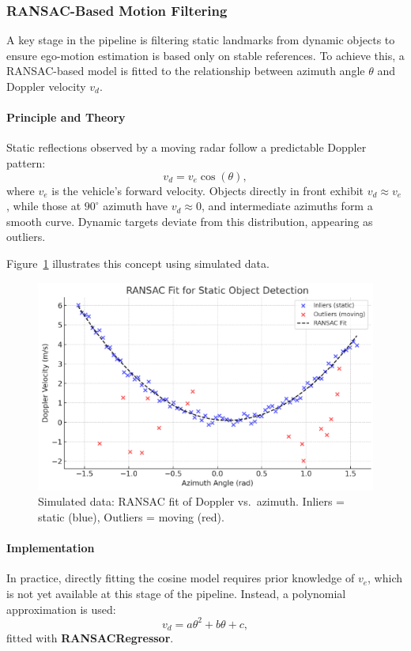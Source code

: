 \subsubsection{RANSAC-Based Motion Filtering}
A key stage in the pipeline is filtering static landmarks from dynamic objects to ensure ego-motion estimation is based only on stable references.  
To achieve this, a RANSAC-based model is fitted to the relationship between azimuth angle $\theta$ and Doppler velocity $v_d$.

\paragraph{Principle and Theory}
Static reflections observed by a moving radar follow a predictable Doppler pattern:
\[
v_d = v_e \cos(\theta),
\]
where $v_e$ is the vehicle’s forward velocity.  
Objects directly in front exhibit $v_d \approx v_e$, while those at $90^\circ$ azimuth have $v_d \approx 0$, and intermediate azimuths form a smooth curve.  
Dynamic targets deviate from this distribution, appearing as outliers.  

Figure~\ref{fig:ransac_simulated_static_dynamic} illustrates this concept using simulated data.

\begin{figure}[!htbp]
    \centering
    \includegraphics[width=0.9\linewidth]{images/RANSAC.png}
    \caption{Simulated data: RANSAC fit of Doppler vs.\ azimuth. Inliers = static (blue), Outliers = moving (red).}
    \label{fig:ransac_simulated_static_dynamic}
\end{figure}

\paragraph{Implementation}
In practice, directly fitting the cosine model requires prior knowledge of $v_e$, which is not yet available at this stage of the pipeline.  
Instead, a polynomial approximation is used:
\[
v_d = a\theta^2 + b\theta + c,
\]
fitted with \textbf{RANSACRegressor}.  

